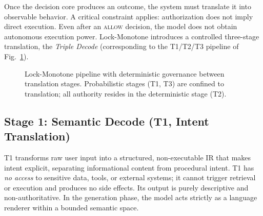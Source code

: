 \documentclass[conference]{IEEEtran}
\begin{document}
Once the decision core produces an outcome, the system must translate it
into observable behavior. A critical constraint applies: authorization
does not imply direct execution. Even after an \textsc{allow} decision,
the model does not obtain autonomous execution power. Lock-Monotone
introduces a controlled three-stage translation, the \emph{Triple Decode}
(corresponding to the T1/T2/T3 pipeline of Fig.~\ref{fig:pipeline}).

\begin{figure}[t]
\centering
{}
\caption{Lock-Monotone pipeline with deterministic governance between
translation stages. Probabilistic stages (T1, T3) are confined to
translation; all authority resides in the deterministic stage (T2).}
\label{fig:pipeline}
\end{figure}

\subsection{Stage 1: Semantic Decode (T1, Intent Translation)}
T1 transforms raw user input into a structured, non-executable IR that
makes intent explicit, separating informational content from procedural
intent. T1 has \emph{no access} to sensitive data, tools, or external
systems; it cannot trigger retrieval or execution and produces no side
effects. Its output is purely descriptive and non-authoritative. In the
generation phase, the model acts strictly as a language renderer within a
bounded semantic space.
\end{document}
